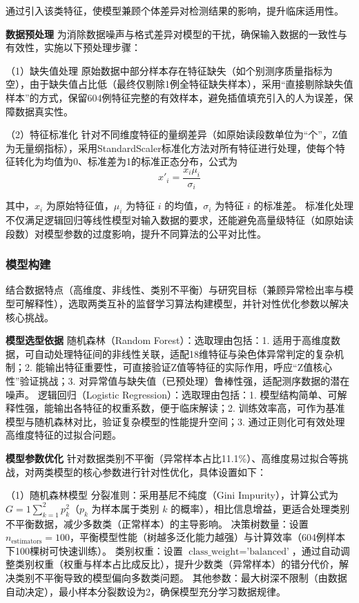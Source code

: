 \documentclass[withoutpreface,bwprint]{cumcmthesis} %
\begin{document}
通过引入该类特征，使模型兼顾个体差异对检测结果的影响，提升临床适用性。

\textbf{数据预处理}
为消除数据噪声与格式差异对模型的干扰，确保输入数据的一致性与有效性，实施以下预处理步骤：  

（1）缺失值处理  
原始数据中部分样本存在特征缺失（如个别测序质量指标为空），由于缺失值占比低（最终仅剔除1例全特征缺失样本），采用“直接剔除缺失值样本”的方式，保留604例特征完整的有效样本，避免插值填充引入的人为误差，保障数据真实性。  

（2）特征标准化  
针对不同维度特征的量纲差异（如原始读段数单位为“个”，Z值为无量纲指标），采用StandardScaler标准化方法对所有特征进行处理，使每个特征转化为均值为0、标准差为1的标准正态分布，公式为
$$ x'_i = \frac{x_{i} \mu_i}{\sigma_i} $$

其中，$ x_i $ 为原始特征值，$ \mu_i $ 为特征 $ i $ 的均值，$ \sigma_i $ 为特征 $ i $ 的标准差。  
标准化处理不仅满足逻辑回归等线性模型对输入数据的要求，还能避免高量级特征（如原始读段数）对模型参数的过度影响，提升不同算法的公平对比性。


\subsubsection{模型构建}
结合数据特点（高维度、非线性、类别不平衡）与研究目标（兼顾异常检出率与模型可解释性），选取两类互补的监督学习算法构建模型，并针对性优化参数以解决核心挑战。

\textbf{模型选型依据}
随机森林（Random Forest）：选取理由包括：1. 适用于高维度数据，可自动处理特征间的非线性关联，适配18维特征与染色体异常判定的复杂机制；2. 能输出特征重要性，可直接验证Z值等特征的实际作用，呼应“Z值核心性”验证挑战；3. 对异常值与缺失值（已预处理）鲁棒性强，适配测序数据的潜在噪声。  
逻辑回归（Logistic Regression）：选取理由包括：1. 模型结构简单、可解释性强，能输出各特征的权重系数，便于临床解读；2. 训练效率高，可作为基准模型与随机森林对比，验证复杂模型的性能提升空间；3. 通过正则化可有效处理高维度特征的过拟合问题。

\textbf{模型参数优化}
针对数据类别不平衡（异常样本占比11.1\%）、高维度易过拟合等挑战，对两类模型的核心参数进行针对性优化，具体设置如下：

（1）随机森林模型
分裂准则：采用基尼不纯度（Gini Impurity），计算公式为 $ G = 1 \sum_{k=1}^2 p_k^2 $（$ p_k $ 为样本属于类别 $ k $ 的概率），相比信息增益，更适合处理类别不平衡数据，减少多数类（正常样本）的主导影响。  
决策树数量：设置 $ n_{\text{estimators}} = 100 $，平衡模型性能（树越多泛化能力越强）与计算效率（604例样本下100棵树可快速训练）。  
类别权重：设置 $ \text{class\_weight} = \text{'balanced'} $，通过自动调整类别权重（权重与样本占比成反比），提升少数类（异常样本）的错分代价，解决类别不平衡导致的模型偏向多数类问题。  
其他参数：最大树深不限制（由数据自动决定），最小样本分裂数设为2，确保模型充分学习数据规律。
\end{document}
